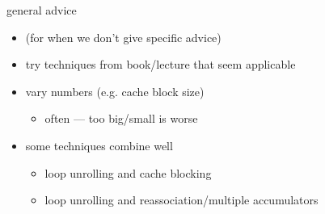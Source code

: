 \begin{frame}{general advice}
    \begin{itemize}
    \item (for when we don't give specific advice)
    \item try techniques from book/lecture that seem applicable
    \item vary numbers (e.g. cache block size)
        \begin{itemize}
        \item often --- too big/small is worse
        \end{itemize}
    \item some techniques combine well
        \begin{itemize}
        \item loop unrolling and cache blocking
        \item loop unrolling and reassociation/multiple accumulators
        \end{itemize}
    \end{itemize}
\end{frame}
